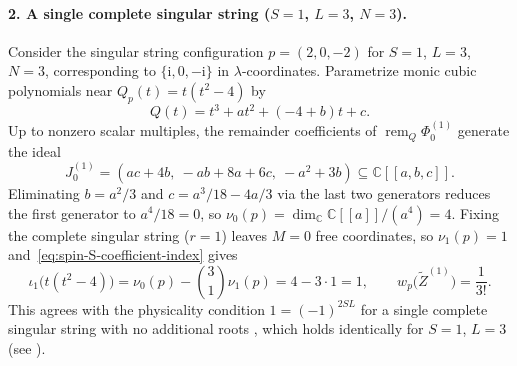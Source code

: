 \documentclass[11pt]{article}
\theoremstyle{definition}
\newcommand{\ii}{\mathrm{i}}
\newcommand{\C}{\mathbb{C}}
\begin{document}
\paragraph{2. A single complete singular string ($S=1$, $L=3$, $N=3$).}
Consider the singular string configuration $p=(2,0,-2)$ for $S=1$, $L=3$, $N=3$, corresponding to
$\{\ii,0,-\ii\}$ in $\lambda$-coordinates. Parametrize monic cubic polynomials near $Q_p(t)=t(t^2-4)$ by
\[
 Q(t)=t^3+a t^2+(-4+b)t+c.
\]
Up to nonzero scalar multiples, the remainder coefficients of $\operatorname{rem}_Q\Phi_0^{(1)}$ generate the ideal
\[
 J_0^{(1)}=(ac+4b,\ -ab+8a+6c,\ -a^2+3b)\subseteq\C[[a,b,c]].
\]
Eliminating $b=a^2/3$ and $c=a^3/18-4a/3$ via the last two generators reduces the first generator to
$a^4/18=0$, so $\nu_0(p)=\dim_\C\C[[a]]/(a^4)=4$. Fixing the complete singular string ($r=1$) leaves $M=0$ free coordinates, so $\nu_1(p)=1$ and~\eqref{eq:spin-S-coefficient-index} gives
\[
 \iota_1\bigl(t(t^2-4)\bigr)=\nu_0(p)-\binom{3}{1}\nu_1(p)=4-3\cdot 1=1,
 \qquad w_p\bigl(\tilde{Z}^{(1)}\bigr)=\frac{1}{3!}.
\]
This agrees with the physicality condition $1=(-1)^{2SL}$ for a single complete singular string with no additional roots \cite[Section~4.1, eq.~(4.14)]{HJJ2024}, which holds identically for $S=1$, $L=3$ (see \cite[Table~1]{HJJ2024}).
\end{document}
